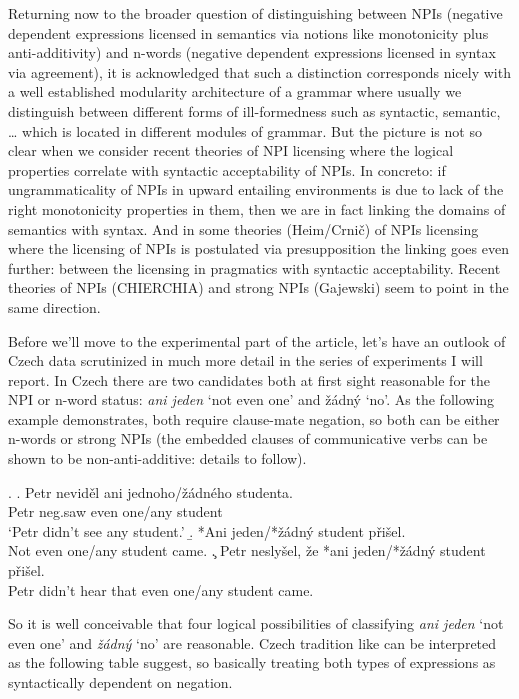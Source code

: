 \documentclass[12pt]{scrartcl}
\begin{document}
Returning now to the broader question of distinguishing between NPIs (negative dependent expressions licensed in semantics via notions like monotonicity plus anti-additivity) and n-words (negative dependent expressions licensed in syntax via agreement), it is acknowledged that such a distinction corresponds nicely with a well established modularity architecture of a grammar where usually we  distinguish between different forms of ill-formedness such as syntactic, semantic, \ldots{} which is located in different modules of grammar. But the picture is not so clear when we consider recent theories of NPI licensing where the  logical properties correlate with syntactic acceptability of NPIs. In concreto: if ungrammaticality of NPIs in upward entailing environments is due to lack of the right monotonicity properties in them, then we are in fact linking the domains of semantics with syntax. And in some theories (Heim/Crnič) of NPIs licensing where the licensing of NPIs is postulated via presupposition the linking goes even further: between the licensing in pragmatics with syntactic acceptability. Recent theories of NPIs (CHIERCHIA) and strong NPIs (Gajewski) seem to point in the same direction.

Before we'll move to the experimental part of the article, let's have an outlook of Czech data scrutinized in much more detail in the series of experiments I will report. In Czech there are two candidates both at first sight reasonable for the NPI or n-word status: \textit{ani jeden} `not even one' and žádný `no'. As the following example demonstrates, both require clause-mate negation, so both can be either n-words or strong NPIs (the embedded clauses of communicative verbs can be shown to be non-anti-additive: details to follow).

\ex. \ag. Petr neviděl ani jednoho/žádného studenta.\\
Petr neg.saw even one/any student\\
`Petr didn't see any student.' \b. *Ani jeden/*žádný student přišel.\\
Not even one/any student came. \c. Petr neslyšel, že *ani jeden/*žádný
student přišel.\\
Petr didn't hear that even one/any student came.

So it is well conceivable that four logical possibilities of classifying \textit{ani jeden} `not even one' and \textit{žádný} `no' are reasonable. Czech tradition like \cite{havranek1960slovnik} can be interpreted as the following table suggest, so basically treating both types of expressions as syntactically dependent on negation.
\end{document}
